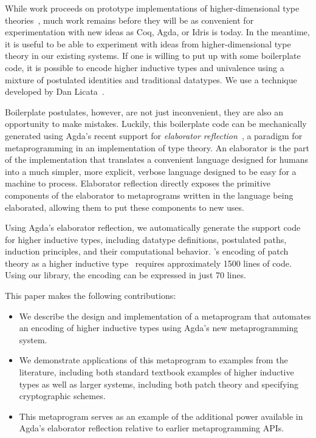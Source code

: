 \documentclass[sigplan,10pt]{acmart}
\begin{document}
While work proceeds on prototype implementations of higher-dimensional type theories~, much work remains before they will be as convenient for experimentation with new ideas as Coq, Agda, or Idris is today.
In the meantime, it is useful to be able to experiment with ideas from higher-dimensional type theory in our existing systems.
If one is willing to put up with some boilerplate code, it is possible to encode higher inductive types and univalence using a mixture of postulated identities and traditional datatypes.
We use a technique developed by Dan Licata~\cite{Licata-2011}.

Boilerplate postulates, however, are not just inconvenient, they are also an opportunity to make mistakes.
Luckily, this boilerplate code can be mechanically generated using Agda's recent support for \emph{elaborator reflection}~\cite{David-2016}, a paradigm for metaprogramming in an implementation of type theory.
An elaborator is the part of the implementation that translates a convenient language designed for humans into a much simpler, more explicit, verbose language designed to be easy for a machine to process.
Elaborator reflection directly exposes the primitive components of the elaborator to metaprograms written in the language being elaborated, allowing them to put these components to new uses.


Using Agda's elaborator reflection, we automatically generate the support code for higher inductive types, including datatype definitions, postulated paths, induction principles, and their computational behavior.
\citeauthor{Angiuli-2014}'s encoding of patch theory as a higher inductive type~\citep{Angiuli-2014} requires approximately 1500 lines of code. Using our library, the encoding can be expressed in just 70 lines.


This paper makes the following contributions:
\begin{itemize}
\item We describe the design and implementation of a metaprogram that automates an encoding of higher inductive types using Agda's new metaprogramming system.
\item We demonstrate applications of this metaprogram to examples from the literature, including both standard textbook examples of higher inductive types as well as larger systems, including both patch theory and specifying cryptographic schemes.
\item This metaprogram serves as an example of the additional power available in Agda's elaborator reflection relative to earlier metaprogramming APIs.
\end{itemize}
\end{document}
